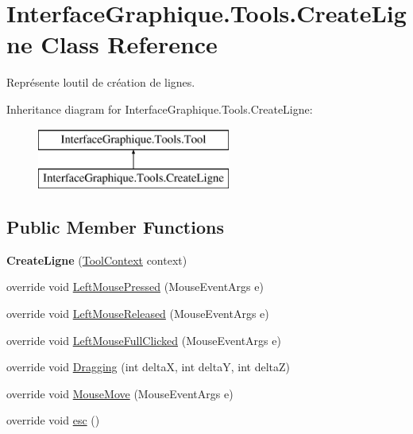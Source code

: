 \hypertarget{class_interface_graphique_1_1_tools_1_1_create_ligne}{}\section{Interface\+Graphique.\+Tools.\+Create\+Ligne Class Reference}
\label{class_interface_graphique_1_1_tools_1_1_create_ligne}


Représente l\textquotesingle{}outil de création de lignes.  


Inheritance diagram for Interface\+Graphique.\+Tools.\+Create\+Ligne\+:\begin{figure}[H]
\begin{center}
\leavevmode
\includegraphics[height=2.000000cm]{class_interface_graphique_1_1_tools_1_1_create_ligne}
\end{center}
\end{figure}
\subsection*{Public Member Functions}
\begin{DoxyCompactItemize}
\item 
\hypertarget{class_interface_graphique_1_1_tools_1_1_create_ligne_a0da55f9f6d189a4e214333cd532c31bc}{}{\bfseries Create\+Ligne} (\hyperlink{class_interface_graphique_1_1_tools_1_1_tool_context}{Tool\+Context} context)\label{class_interface_graphique_1_1_tools_1_1_create_ligne_a0da55f9f6d189a4e214333cd532c31bc}

\item 
override void \hyperlink{class_interface_graphique_1_1_tools_1_1_create_ligne_a952552e78bc24616026ecd5502dcd0ac}{Left\+Mouse\+Pressed} (Mouse\+Event\+Args e)
\item 
override void \hyperlink{class_interface_graphique_1_1_tools_1_1_create_ligne_aed5895d2081942fbe80022c99b8de5dc}{Left\+Mouse\+Released} (Mouse\+Event\+Args e)
\item 
override void \hyperlink{class_interface_graphique_1_1_tools_1_1_create_ligne_a5ea6ec82fe9e433ee36d6ca2fcbf6418}{Left\+Mouse\+Full\+Clicked} (Mouse\+Event\+Args e)
\item 
override void \hyperlink{class_interface_graphique_1_1_tools_1_1_create_ligne_a5862dbb249d4286c8663e47730a4ec0d}{Dragging} (int delta\+X, int delta\+Y, int delta\+Z)
\item 
override void \hyperlink{class_interface_graphique_1_1_tools_1_1_create_ligne_abc111e3dc2d9dfe15050d58631c45564}{Mouse\+Move} (Mouse\+Event\+Args e)
\item 
override void \hyperlink{class_interface_graphique_1_1_tools_1_1_create_ligne_ad332e361745a2425029bb2c09614d6ef}{esc} ()
\end{DoxyCompactItemize}
